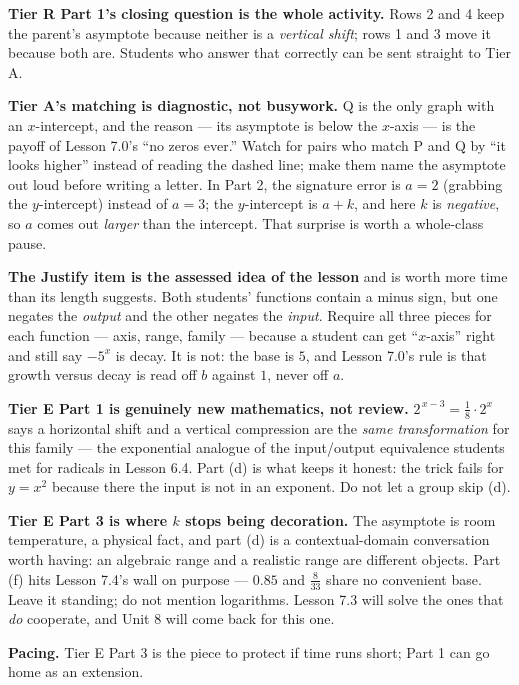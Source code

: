 \documentclass[10pt]{article}
\begin{document}
\begin{teachernote}
\textbf{Tier R Part 1's closing question is the whole activity.} Rows 2 and 4 keep the parent's
asymptote because neither is a \emph{vertical shift}; rows 1 and 3 move it because both are. Students
who answer that correctly can be sent straight to Tier A.

\textbf{Tier A's matching is diagnostic, not busywork.} Q is the only graph with an $x$-intercept, and
the reason --- its asymptote is below the $x$-axis --- is the payoff of Lesson 7.0's ``no zeros ever.''
Watch for pairs who match P and Q by ``it looks higher'' instead of reading the dashed line; make them
name the asymptote out loud before writing a letter. In Part 2, the signature error is $a=2$ (grabbing
the $y$-intercept) instead of $a=3$; the $y$-intercept is $a+k$, and here $k$ is \emph{negative}, so
$a$ comes out \emph{larger} than the intercept. That surprise is worth a whole-class pause.

\textbf{The Justify item is the assessed idea of the lesson} and is worth more time than its length
suggests. Both students' functions contain a minus sign, but one negates the \emph{output} and the
other negates the \emph{input}. Require all three pieces for each function --- axis, range, family ---
because a student can get ``$x$-axis'' right and still say $-5^{x}$ is decay. It is not: the base is
$5$, and Lesson 7.0's rule is that growth versus decay is read off $b$ against $1$, never off $a$.

\textbf{Tier E Part 1 is genuinely new mathematics, not review.} $2^{\,x-3}=\frac18\cdot 2^{x}$ says a
horizontal shift and a vertical compression are the \emph{same transformation} for this family --- the
exponential analogue of the input/output equivalence students met for radicals in Lesson 6.4. Part (d)
is what keeps it honest: the trick fails for $y=x^{2}$ because there the input is not in an exponent.
Do not let a group skip (d).

\textbf{Tier E Part 3 is where $k$ stops being decoration.} The asymptote is room temperature, a
physical fact, and part (d) is a contextual-domain conversation worth having: an algebraic range and a
realistic range are different objects. Part (f) hits Lesson 7.4's wall on purpose --- $0.85$ and
$\frac{8}{33}$ share no convenient base. Leave it standing; do not mention logarithms. Lesson 7.3 will
solve the ones that \emph{do} cooperate, and Unit 8 will come back for this one.

\textbf{Pacing.} Tier E Part 3 is the piece to protect if time runs short; Part 1 can go home as an
extension.
\end{teachernote}
\end{document}
